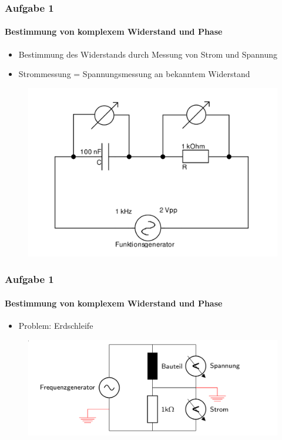 \begin{frame}
\frametitle{Aufgabe 1}
\framesubtitle{Bestimmung von komplexem Widerstand und Phase}
    \begin{itemize}
        \item Bestimmung des Widerstands durch Messung von Strom und Spannung
        \item Strommessung = Spannungsmessung an bekanntem Widerstand
    \end{itemize}    
    \begin{figure}[H]
    \begin{center}
            \includegraphics[scale=0.15]{./img/schaltbild_1_ohne_erdung.png}
    \end{center}
    \end{figure}
\end{frame}
\begin{frame}
\frametitle{Aufgabe 1}
\framesubtitle{Bestimmung von komplexem Widerstand und Phase}
    \begin{itemize}
        \item Problem: Erdschleife
    \end{itemize}
    \begin{figure}[H]
    \begin{center}
            \includegraphics[scale=0.3]{./img/schaltbild_1_alle_erdungen.png}
    \end{center}
    \end{figure}
\end{frame}
